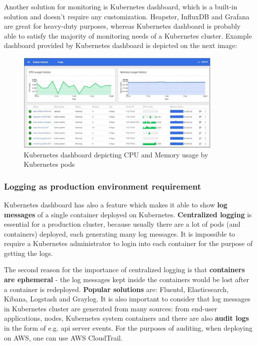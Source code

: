 Another solution for monitoring is Kubernetes dashboard, which is a built-in solution and doesn't require any customization. Heapster, InfluxDB and Grafana are great for heavy-duty purposes, whereas Kubernetes dashboard is probably able to satisfy the majority of monitoring needs of a Kubernetes cluster\cite{book-mastering-k8s}\cite{book-devops-k8s}. Example dashboard provided by Kubernetes dashboard is depicted on the next image:
\begin{figure}[H]
  \centering
  \includegraphics[width=10cm]{figures/k8s-dashboard.png}
  \caption{Kubernetes dashboard depicting CPU and Memory usage by Kubernetes pods\cite{book-mastering-k8s}}
\end{figure}

\subsubsection{Logging as production environment requirement}
Kubernetes dashboard has also a feature which makes it able to show \textbf{log messages} of a single container deployed on Kubernetes\cite{book-mastering-k8s}. \textbf{Centralized logging} is essential for a production cluster, because usually there are a lot of pods (and containers) deployed, each generating many log messages. It is impossible to require a Kubernetes administrator to login into each container for the purpose of getting the logs.

The second reason for the importance of centralized logging is that \textbf{containers are ephemeral} - the log messages kept inside the containers would be lost after a container is redeployed. \textbf{Popular solutions} are: Fluentd, Elasticsearch, Kibana\cite{book-mastering-k8s}, Logstash\cite{book-devops-k8s} and Graylog\cite{online-prod-year-k8s}\cite{online-graylog}. It is also important to consider that log messages in Kubernetes cluster are generated from many sources: from end-user applications, nodes, Kubernetes system containers and there are also \textbf{audit logs} in the form of e.g. api server events\cite{online-graylog-art}. For the purposes of auditing, when deploying on AWS, one can use AWS CloudTrail\cite{online-ct}.

